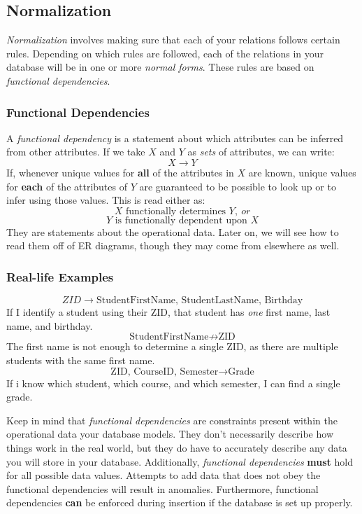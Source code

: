 \documentclass{report}
\begin{document}
    \subsection{Normalization}
    \textit{Normalization} involves making sure that each of your relations follows certain rules. Depending on which rules are followed, each of the relations in your database will be in one or more \textit{normal forms}. These rules are based on \textit{functional dependencies}.
    \subsubsection{Functional Dependencies}
    A \textit{functional dependency} is a statement about which attributes can be inferred from other attributes. If we take $X$ and $Y$ as \textit{sets} of attributes, we can write:
    $$ X \rightarrow Y$$
    If, whenever unique values for \textbf{all} of the attributes in $X$ are known, unique values for \textbf{each} of the attributes of $Y$ are guaranteed to be possible to look up or to infer using those values.
    This is read either as:
    $$ \text{$X$ functionally determines $Y$}, \ or $$
    $$ Y \text{ is functionally dependent upon } X$$
    They are statements about the operational data. Later on, we will see how to read them off of ER diagrams, though they may come from elsewhere as well.
    \begin{mdframed}
        \vspace{-4mm}\subsubsection*{Real-life Examples}
    $$ ZID \rightarrow \text{StudentFirstName, StudentLastName, Birthday}$$
    If I identify a student using their ZID, that student has \textit{one} first name, last name, and birthday.
    $$ \text{StudentFirstName} \nrightarrow  \text{ZID} $$
    The first name is not enough to determine a single ZID, as there are multiple students with the same first name.
    $$ \text{ZID, CourseID, Semester} \rightarrow \text{Grade} $$
    If i know which student, which course, and which semester, I can find a single grade.
\end{mdframed}
\bigbreak \noindent
Keep in mind that \textit{functional dependencies} are constraints present within the operational data your database models. They don't necessarily describe how things work in the real world, but they do have to accurately describe any data you will store in your database. 
\bigbreak \noindent
Additionally, \textit{functional dependencies} \textbf{must} hold for all possible data values. Attempts to add data that does not obey the functional dependencies will result in anomalies. 
\bigbreak \noindent
Furthermore, functional dependencies \textbf{can} be enforced during insertion if the database is set up properly.
\end{document}
